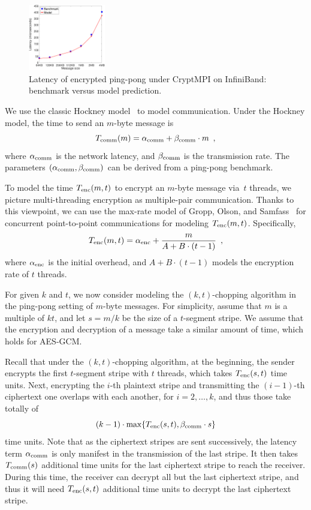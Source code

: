 \begin{figure}[t]
	\centering
	\vspace{-2.5ex}
		\includegraphics[width=0.3\textwidth]{graphs/model-valid.eps}
		\vspace{-1ex}
	\caption{Latency of encrypted ping-pong under CryptMPI on InfiniBand: benchmark versus model prediction. }
		\vspace{-0.5ex}
	\label{fig:model-valid}
	\vspace{-2.5ex}
\end{figure}


We use the classic Hockney model~\cite{Hockney94} to model
communication. Under the Hockney model, the time to send an $m$-byte message is
\[
T_{\mathrm{comm}}(m) = \alpha_{\mathrm{comm}} + \beta_{\mathrm{comm}} \cdot m \enspace,
\]
where $\alpha_{\mathrm{comm}}$ is the network latency, and $\beta_{\mathrm{comm}}$ is the transmission rate.
The parameters $(\alpha_{\mathrm{comm}},\beta_{\mathrm{comm}})$ can be derived from a ping-pong benchmark.

To model the time $T_{\mathrm{enc}}(m, t)$ to encrypt an $m$-byte message via~$t$ threads, we picture multi-threading encryption as multiple-pair
communication. Thanks to this viewpoint, 
we can use the max-rate model of Gropp, Olson, and Samfass~\cite{gropp2016modeling} for concurrent point-to-point communications
for modeling $T_{\mathrm{enc}}(m, t)$. Specifically, 
\[
T_{\mathrm{enc}}(m, t) = \alpha_{\mathrm{enc}} + \dfrac{m}{A+B\cdot (t-1)} \enspace,
\]
where $\alpha_{\mathrm{enc}}$ is the initial overhead, and $A + B \cdot (t - 1)$
models the encryption rate of $t$ threads. 



For given $k$ and $t$, we now consider modeling the
$(k, t)$-chopping algorithm in the ping-pong setting of $m$-byte messages. 
For simplicity, assume that $m$ is a multiple
of $kt$, and let $s = m / k$ be the size of a $t$-segment stripe. 
We assume that the encryption
and decryption of a message take a similar amount of time, which holds for AES-GCM. 


Recall that under the $(k, t)$-chopping algorithm, 
at the beginning, the sender encrypts the first  $t$-segment stripe with $t$ threads,
which takes $T_{\mathrm{enc}}(s, t)$ time units. Next, encrypting the $i$-th plaintext stripe
and transmitting the $(i-1)$-th  ciphertext one overlaps with each another,
for $i = 2, \ldots, k$, 
and thus those take totally of  
\[ (k - 1)  \cdot \max\{ T_{\mathrm{enc}}(s, t), \beta_{\mathrm{comm}} \cdot s \}  \] 
time units. Note that as the ciphertext stripes are sent successively,
the latency term  $\alpha_{\mathrm{comm}}$ is only manifest in the transmission of the
last stripe. 
It then takes $T_{\mathrm{comm}}(s)$ additional time units for the
last ciphertext  stripe to reach the receiver. 
During this time, the receiver can decrypt all but the last ciphertext stripe, 
and thus it will need $T_{\mathrm{enc}}(s, t)$ additional time units to decrypt the
last ciphertext stripe.

